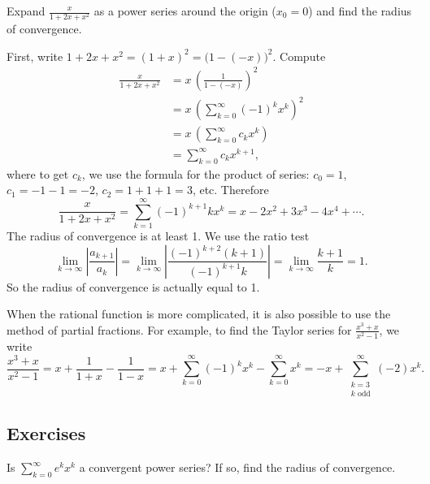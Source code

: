 \begin{example}
Expand $\frac{x}{1+2x+x^2}$ as a power series around the origin ($x_0 = 0$) and
find the radius of convergence.

First, write $1+2x+x^2 = {(1+x)}^2 = {\bigl(1-(-x)\bigr)}^2$.
Compute
\begin{equation*}
\begin{split}
\frac{x}{1+2x+x^2}
&=
x \,
{\left(
\frac{1}{1-(-x)}
\right)}^2
\\
&=
x \,
{ \left( 
\sum_{k=0}^\infty {(-1)}^k x^k 
\right)}^2
\\
&=
x \,
\left(
\sum_{k=0}^\infty c_k x^k 
\right)
\\
&=
\sum_{k=0}^\infty c_k x^{k+1} ,
\end{split}
\end{equation*}
where to get $c_k$, we use the formula for the product of series:
$c_0 = 1$, $c_1 = -1 -1 = -2$, $c_2 = 1+1+1 = 3$, etc.
Therefore
\begin{equation*}
\frac{x}{1+2x+x^2}
=
\sum_{k=1}^\infty {(-1)}^{k+1} k x^k
= x-2x^2+3x^3-4x^4+\cdots .
\end{equation*}
The radius of convergence is at least 1.  We use the ratio test
\begin{equation*}
\lim_{k\to\infty}
\left\lvert \frac{a_{k+1}}{a_k} \right\rvert
=
\lim_{k\to\infty}
\left\lvert \frac{{(-1)}^{k+2} (k+1)}{{(-1)}^{k+1}k} \right\rvert
=
\lim_{k\to\infty}
\frac{k+1}{k}
= 1 .
\end{equation*}
So the radius of convergence is actually equal to 1.
\end{example}

When the rational function is more complicated, it is also possible
to use the method of partial fractions.  For example,
to find the Taylor series for $\frac{x^3+x}{x^2-1}$, we write
\begin{equation*}
\frac{x^3+x}{x^2-1}
=
x + \frac{1}{1+x} - \frac{1}{1-x}
=
x + \sum_{k=0}^\infty {(-1)}^k x^k - \sum_{k=0}^\infty x^k
=
- x + \sum_{\substack{k=3 \\ k \text{ odd}}}^\infty (-2) x^k .
\end{equation*}

\subsection{Exercises}

\begin{exercise}
Is $\displaystyle \sum_{k=0}^\infty e^k x^k$ a convergent power series?
If so, find the radius of convergence.
\end{exercise}


